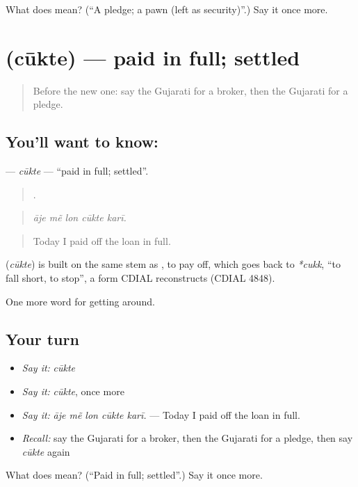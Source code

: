\begin{tcolorbox}[breakable,colback=teal!4,colframe=teal!35!black,title={Before you move on}]
What does  mean? (\textquotedblleft{}A pledge; a pawn (left as security)\textquotedblright{}.) Say it once more.
\end{tcolorbox}
\section[\texorpdfstring{\gu{ચૂકતે} (cūkte)}{ચૂકતે (cūkte)}]{ (cūkte) — paid in full; settled}

\label{lesson:GU-C425-cukte}



\begin{quote}
Before the new one: say the Gujarati for a broker, then the Gujarati for a pledge.
\end{quote}

\subsection*{You'll want to know: }
\textbf{} — \emph{cūkte} — \textquotedblleft{}paid in full; settled\textquotedblright{}.

\begin{quote}
    .
\end{quote}

\begin{quote}
\emph{āje mẽ lon cūkte karī.}
\end{quote}

\begin{quote}
Today I paid off the loan in full.
\end{quote}

\begin{cousinweb}
\textbf{} (\emph{cūkte}) is built on the same stem as , to pay off, which goes back to \emph{*cukk}, \textquotedblleft{}to fall short, to stop\textquotedblright{}, a form CDIAL reconstructs (CDIAL 4848).
\end{cousinweb}

\begin{grammarlens}[title={What you've built}]
One more word for getting around.
\end{grammarlens}

\subsection*{Your turn}
\begin{itemize}
\raggedright
  \item \emph{Say it:} \emph{cūkte}
  \item \emph{Say it:} \emph{cūkte}, once more
  \item \emph{Say it:} \emph{āje mẽ lon cūkte karī.} — Today I paid off the loan in full.
  \item \emph{Recall:} say the Gujarati for a broker, then the Gujarati for a pledge, then say \emph{cūkte} again
\end{itemize}

\begin{tcolorbox}[breakable,colback=teal!4,colframe=teal!35!black,title={Before you move on}]
What does  mean? (\textquotedblleft{}Paid in full; settled\textquotedblright{}.) Say it once more.
\end{tcolorbox}
